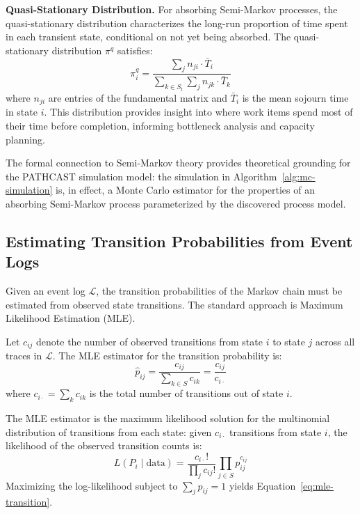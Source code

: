 \textbf{Quasi-Stationary Distribution.} For absorbing Semi-Markov
processes, the quasi-stationary distribution characterizes the long-run
proportion of time spent in each transient state, conditional on not
yet being absorbed. The quasi-stationary distribution $\pi^q$ satisfies:
\begin{equation}
\label{eq:quasi-stationary}
\pi^q_i = \frac{\sum_j n_{ji} \cdot \bar{T}_i}
{\sum_{k \in S_t} \sum_j n_{jk} \cdot \bar{T}_k}
\end{equation}
where $n_{ji}$ are entries of the fundamental matrix and $\bar{T}_i$
is the mean sojourn time in state $i$. This distribution provides
insight into where work items spend most of their time before completion,
informing bottleneck analysis and capacity planning.

The formal connection to Semi-Markov theory provides theoretical
grounding for the PATHCAST simulation model: the simulation in
Algorithm~\ref{alg:mc-simulation} is, in effect, a Monte Carlo
estimator for the properties of an absorbing Semi-Markov process
parameterized by the discovered process model.


\subsection{Estimating Transition Probabilities from Event Logs}
\label{sec:markov-estimation}

Given an event log $\mathcal{L}$, the transition probabilities of the
Markov chain must be estimated from observed state transitions. The
standard approach is Maximum Likelihood Estimation (MLE).

Let $c_{ij}$ denote the number of observed transitions from state $i$ to
state $j$ across all traces in $\mathcal{L}$. The MLE estimator for the
transition probability is:
\begin{equation}
\label{eq:mle-transition}
\hat{p}_{ij} = \frac{c_{ij}}{\sum_{k \in S} c_{ik}}
= \frac{c_{ij}}{c_{i \cdot}}
\end{equation}
where $c_{i \cdot} = \sum_k c_{ik}$ is the total number of transitions
out of state $i$.

The MLE estimator is the maximum likelihood solution for the multinomial
distribution of transitions from each state: given $c_{i\cdot}$
transitions from state $i$, the likelihood of the observed transition
counts is:
\begin{equation}
\label{eq:mle-full}
L(P_i \mid \text{data}) = \frac{c_{i\cdot}!}{\prod_j c_{ij}!}
\prod_{j \in S} p_{ij}^{c_{ij}}
\end{equation}
Maximizing the log-likelihood subject to $\sum_j p_{ij} = 1$ yields
Equation~\ref{eq:mle-transition}.

